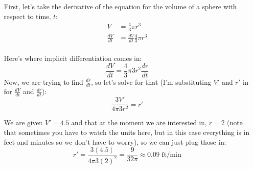 First, let's take the derivative of the equation for the volume of a sphere with respect to time, $t$:
\begin{align*}
    V &= \frac{4}{3}\pi r^3\\
    \frac{dV}{dt} & = \frac{dV}{dt}\frac{4}{3}\pi r^3\\
\end{align*}

Here's where implicit differentiation comes in:
\begin{equation*}
    \frac{dV}{dt} = \frac{4}{3}\pi 3r^2\frac{dr}{dt}
\end{equation*}
Now, we are trying to find $\frac{dr}{dt}$, so let's solve for that (I'm substituting $V'$ and $r'$ in for $\frac{dV}{dt}$ and $\frac{dr}{dt}$):
\begin{equation*}
    \frac{3V'}{4\pi 3r^2} = r'
\end{equation*}

We are given $V' = 4.5$ and that at the moment we are interested in, $r = 2$ (note that sometimes you have to watch the units here, but in this case everything is in feet and minutes so we don't have to worry), so we can just plug those in:
\begin{equation*}
    r' = \frac{3(4.5)}{4\pi 3(2)^2} = \frac{9}{32\pi} \approx 0.09 \text{ ft/min}
\end{equation*}